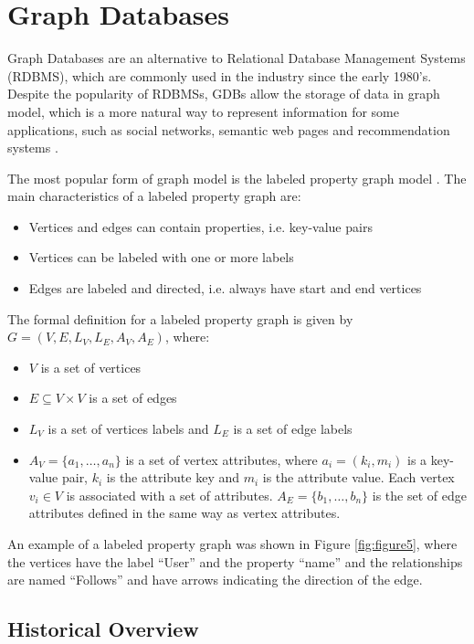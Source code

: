 \section{Graph Databases}

Graph Databases are an alternative to Relational Database Management Systems (RDBMS), which are commonly used in the industry since the early 1980's. Despite the popularity of RDBMSs, GDBs allow the storage of data in graph model, which is a more natural way to represent information for some applications, such as social networks, semantic web pages and recommendation systems \cite{Miller2013}.

The most popular form of graph model is the labeled property graph model \cite{Robinson2015}. The main characteristics of a labeled property graph are:
\begin{itemize}
\item Vertices and edges can contain properties, i.e. key-value pairs
\item Vertices can be labeled with one or more labels
\item Edges are labeled and directed, i.e. always have start and end vertices
\end{itemize}

The formal definition for a labeled property graph is given by $G = (V, E, L_V, L_E, A_V, A_E)$, where:
\begin{itemize}
\item $V$ is a set of vertices
\item $E \subseteq V \times V$ is a set of edges
\item $L_V$ is a set of vertices labels and $L_E$ is a set of edge labels
\item $A_V = \{a_1, \dots, a_n\}$ is a set of vertex attributes, where $a_i = (k_i, m_i)$ is a key-value pair, $k_i$ is the attribute key and $m_i$ is the attribute value. Each vertex $v_i \in V$ is associated with a set of attributes. $A_E = \{b_1, \dots, b_n\}$ is the set of edge attributes defined in the same way as vertex attributes.
\end{itemize}

An example of a labeled property graph was shown in Figure \ref{fig:figure5}, where the vertices have the label ``User'' and the property ``name'' and the relationships are named ``Follows'' and have arrows indicating the direction of the edge.

\subsection{Historical Overview}

